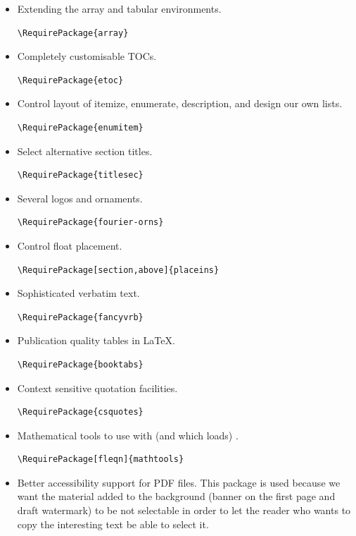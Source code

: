 \documentclass{letgut}
\begin{document}
\begin{itemize}
\item Extending the array and tabular environments.
\begin{lstlisting}
\RequirePackage{array}
\end{lstlisting}
\item Completely customisable TOCs.
\begin{lstlisting}
\RequirePackage{etoc}
\end{lstlisting}
\item Control layout of itemize, enumerate, description, and design our own lists.
\begin{lstlisting}
\RequirePackage{enumitem}
\end{lstlisting}
\item Select alternative section titles.
\begin{lstlisting}
\RequirePackage{titlesec}
\end{lstlisting}
\item Several logos and ornaments.
\begin{lstlisting}
\RequirePackage{fourier-orns}
\end{lstlisting}
\item Control float placement.
\begin{lstlisting}
\RequirePackage[section,above]{placeins}
\end{lstlisting}
\item Sophisticated verbatim text.
\begin{lstlisting}
\RequirePackage{fancyvrb}
\end{lstlisting}
\item Publication quality tables in \LaTeX{}.
\begin{lstlisting}
\RequirePackage{booktabs}
\end{lstlisting}
\item Context sensitive quotation facilities.
\begin{lstlisting}
\RequirePackage{csquotes}
\end{lstlisting}
\item Mathematical tools to use with (and which loads) .
\begin{lstlisting}
\RequirePackage[fleqn]{mathtools}
\end{lstlisting}
\item Better accessibility support for PDF files. This package is used because we
want the material added to the background (banner on the first page and draft
watermark) to be not selectable in order to let the reader who wants to copy
the interesting text be able to select it.
\end{itemize}
\end{document}
